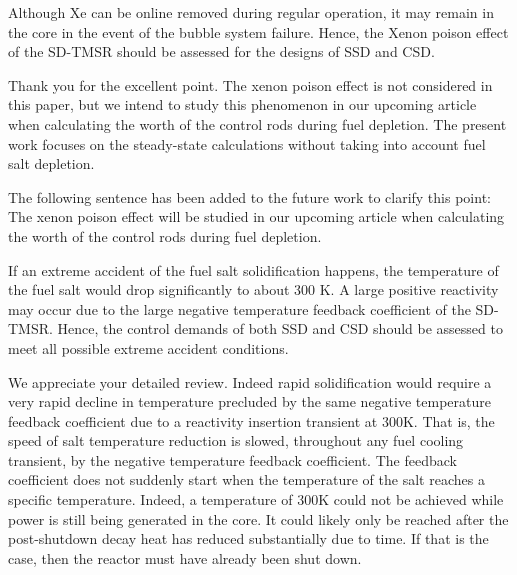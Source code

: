 \documentclass[answers,11pt]{exam}
\begin{document}
\begin{questions}
\begin{solution}
        \end{solution}

        \question  Although Xe can be online removed during regular operation, it may remain in the core in the event of the bubble system failure. Hence, the Xenon poison effect of the SD-TMSR should be assessed for the designs of SSD and CSD. 
        \begin{solution}
		         
		         Thank you for the excellent point. The xenon poison effect is not considered in this paper, but we intend to study this phenomenon in our upcoming article when calculating the worth of the control rods during fuel depletion. The present work focuses on the steady-state calculations without taking into account fuel salt depletion.
		         
		         The following sentence has been added to the future work to clarify this point:\\
		         
		         The xenon poison effect will be studied in our upcoming article when calculating the worth of the control rods during fuel depletion.
		          
		           
    
        \end{solution}

	
	\question If an extreme accident of the fuel salt solidification happens, the temperature of the fuel salt would drop significantly to about 300 K. A large positive reactivity may occur due to the large negative temperature feedback coefficient of the SD-TMSR. Hence, the control demands of both SSD and CSD should be assessed to meet all possible extreme accident conditions.
	\begin{solution}
		
	We appreciate your detailed review.
	Indeed rapid solidification would require a very rapid decline in temperature precluded by the same negative temperature feedback coefficient due to a reactivity insertion transient at 300K. That is, the speed of salt temperature reduction is slowed, throughout any fuel cooling transient, by the negative temperature feedback coefficient. The feedback coefficient does not suddenly start when the temperature of the salt reaches a specific temperature. Indeed, a temperature of 300K could not be achieved while power is still being generated in the core. It could likely only be reached after the post-shutdown decay heat has reduced substantially due to time. If that is the case, then the reactor must have already been shut down.
	

\end{solution}
\end{questions}
\end{document}
